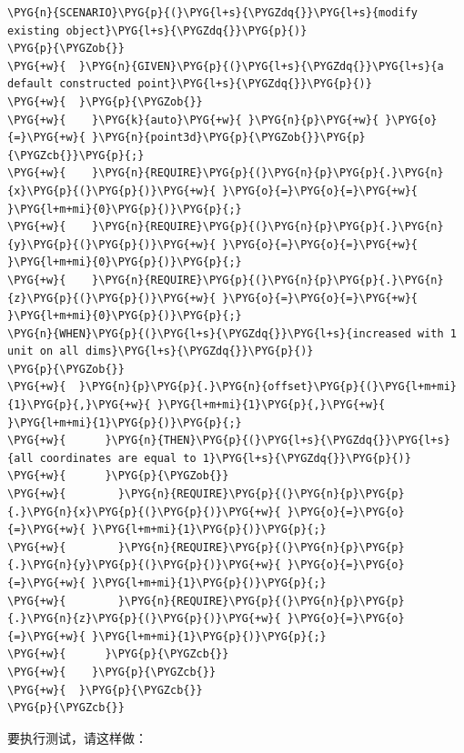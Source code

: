 \begin{itemize}
\begin{codeblockbg}
\begin{Verbatim}[commandchars=\\\{\},breaklines=true,breakanywhere=true,fontsize=\codefont,xleftmargin=17bp]
\PYG{n}{SCENARIO}\PYG{p}{(}\PYG{l+s}{\PYGZdq{}}\PYG{l+s}{modify existing object}\PYG{l+s}{\PYGZdq{}}\PYG{p}{)}
\PYG{p}{\PYGZob{}}
\PYG{+w}{  }\PYG{n}{GIVEN}\PYG{p}{(}\PYG{l+s}{\PYGZdq{}}\PYG{l+s}{a default constructed point}\PYG{l+s}{\PYGZdq{}}\PYG{p}{)}
\PYG{+w}{  }\PYG{p}{\PYGZob{}}
\PYG{+w}{    }\PYG{k}{auto}\PYG{+w}{ }\PYG{n}{p}\PYG{+w}{ }\PYG{o}{=}\PYG{+w}{ }\PYG{n}{point3d}\PYG{p}{\PYGZob{}}\PYG{p}{\PYGZcb{}}\PYG{p}{;}
\PYG{+w}{    }\PYG{n}{REQUIRE}\PYG{p}{(}\PYG{n}{p}\PYG{p}{.}\PYG{n}{x}\PYG{p}{(}\PYG{p}{)}\PYG{+w}{ }\PYG{o}{=}\PYG{o}{=}\PYG{+w}{ }\PYG{l+m+mi}{0}\PYG{p}{)}\PYG{p}{;}
\PYG{+w}{    }\PYG{n}{REQUIRE}\PYG{p}{(}\PYG{n}{p}\PYG{p}{.}\PYG{n}{y}\PYG{p}{(}\PYG{p}{)}\PYG{+w}{ }\PYG{o}{=}\PYG{o}{=}\PYG{+w}{ }\PYG{l+m+mi}{0}\PYG{p}{)}\PYG{p}{;}
\PYG{+w}{    }\PYG{n}{REQUIRE}\PYG{p}{(}\PYG{n}{p}\PYG{p}{.}\PYG{n}{z}\PYG{p}{(}\PYG{p}{)}\PYG{+w}{ }\PYG{o}{=}\PYG{o}{=}\PYG{+w}{ }\PYG{l+m+mi}{0}\PYG{p}{)}\PYG{p}{;}
\PYG{n}{WHEN}\PYG{p}{(}\PYG{l+s}{\PYGZdq{}}\PYG{l+s}{increased with 1 unit on all dims}\PYG{l+s}{\PYGZdq{}}\PYG{p}{)}
\PYG{p}{\PYGZob{}}
\PYG{+w}{  }\PYG{n}{p}\PYG{p}{.}\PYG{n}{offset}\PYG{p}{(}\PYG{l+m+mi}{1}\PYG{p}{,}\PYG{+w}{ }\PYG{l+m+mi}{1}\PYG{p}{,}\PYG{+w}{ }\PYG{l+m+mi}{1}\PYG{p}{)}\PYG{p}{;}
\PYG{+w}{      }\PYG{n}{THEN}\PYG{p}{(}\PYG{l+s}{\PYGZdq{}}\PYG{l+s}{all coordinates are equal to 1}\PYG{l+s}{\PYGZdq{}}\PYG{p}{)}
\PYG{+w}{      }\PYG{p}{\PYGZob{}}
\PYG{+w}{        }\PYG{n}{REQUIRE}\PYG{p}{(}\PYG{n}{p}\PYG{p}{.}\PYG{n}{x}\PYG{p}{(}\PYG{p}{)}\PYG{+w}{ }\PYG{o}{=}\PYG{o}{=}\PYG{+w}{ }\PYG{l+m+mi}{1}\PYG{p}{)}\PYG{p}{;}
\PYG{+w}{        }\PYG{n}{REQUIRE}\PYG{p}{(}\PYG{n}{p}\PYG{p}{.}\PYG{n}{y}\PYG{p}{(}\PYG{p}{)}\PYG{+w}{ }\PYG{o}{=}\PYG{o}{=}\PYG{+w}{ }\PYG{l+m+mi}{1}\PYG{p}{)}\PYG{p}{;}
\PYG{+w}{        }\PYG{n}{REQUIRE}\PYG{p}{(}\PYG{n}{p}\PYG{p}{.}\PYG{n}{z}\PYG{p}{(}\PYG{p}{)}\PYG{+w}{ }\PYG{o}{=}\PYG{o}{=}\PYG{+w}{ }\PYG{l+m+mi}{1}\PYG{p}{)}\PYG{p}{;}
\PYG{+w}{      }\PYG{p}{\PYGZcb{}}
\PYG{+w}{    }\PYG{p}{\PYGZcb{}}
\PYG{+w}{  }\PYG{p}{\PYGZcb{}}
\PYG{p}{\PYGZcb{}}
\end{Verbatim}
\end{codeblockbg}

\end{itemize}



要执行测试，请这样做：


